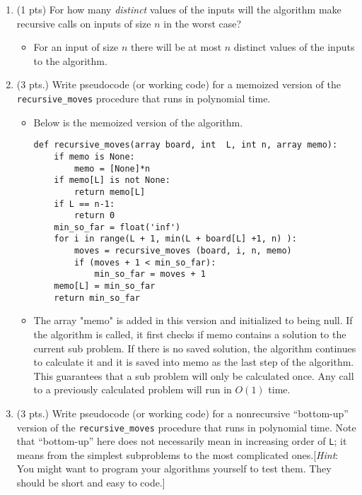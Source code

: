 \documentclass[letterpaper,11pt]{article}
\begin{document}
\begin{enumerate}
\begin{enumerate}
  \item (1 pts) For how many \emph{distinct} values of the inputs will
    the algorithm make recursive calls on
    inputs of size $n$ in the worst case?
    \begin{itemize}
        \color{teal}
        \item For an input of size $n$ there will be at most $n$ distinct 
            values of the inputs to the algorithm. 
    \end{itemize}
    
    \item (3 pts.) Write  pseudocode (or working code) for a memoized version of the \texttt{recursive\_moves} procedure that runs in polynomial time.

    \begin{itemize}
        \color{teal}
        \item Below is the memoized version of the algorithm.

\begin{verbatim}
def recursive_moves(array board, int  L, int n, array memo):
    if memo is None:
        memo = [None]*n
    if memo[L] is not None:
        return memo[L]
    if L == n-1:
        return 0
    min_so_far = float('inf')
    for i in range(L + 1, min(L + board[L] +1, n) ): 
        moves = recursive_moves (board, i, n, memo) 
        if (moves + 1 < min_so_far): 
            min_so_far = moves + 1
    memo[L] = min_so_far
    return min_so_far
\end{verbatim}

        \item The array "memo" is added in this version and initialized to
            being null. If the algorithm is called, it first checks if memo 
            contains a solution to the current sub problem. If there is no 
            saved solution, the algorithm continues to calculate it and it is
            saved into memo as the last step of the algorithm. This guarantees 
            that a sub problem will only be calculated once. Any call to a 
            previously calculated problem will run in $O\left( 1 \right) $ time.

    \end{itemize}

    \item (3 pts.) Write  pseudocode (or working code)  for a nonrecursive  ``bottom-up'' version of the \texttt{recursive\_moves} procedure that runs in polynomial time. Note that ``bottom-up'' here does not necessarily mean in increasing order of \texttt{L}; it means from the simplest subproblems to the most complicated ones.[\emph{Hint}: You might want to program your algorithms yourself to
  test them. They should be short and easy to code.]


\end{enumerate}
\end{enumerate}
\end{document}
